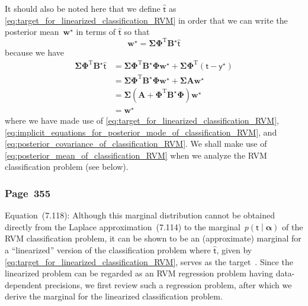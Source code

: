 \documentclass[12pt,a4paper]{article}
\newcommand{\erratum}[1]{%
\subsubsection*{#1}
\addcontentsline{toc}{subsection}{#1}}
\begin{document}
It should also be noted here that we define $\widehat{\bm{\mathsf{t}}}$ as
\eqref{eq:target_for_linearized_classification_RVM}
in order that we can write
the posterior mean~$\mathbf{w}^{\star}$ in terms of $\widehat{\bm{\mathsf{t}}}$ so that
\begin{equation}
\mathbf{w}^{\star}
= \bm{\Sigma} \bm{\Phi}^{\operatorname{T}} \mathbf{B}^{\star} \widehat{\bm{\mathsf{t}}}
\label{eq:posterior_mean_of_classification_RVM}
\end{equation}
because we have
\begin{align}
\bm{\Sigma} \bm{\Phi}^{\operatorname{T}} \mathbf{B}^{\star} \widehat{\bm{\mathsf{t}}}
&= \bm{\Sigma} \bm{\Phi}^{\operatorname{T}} \mathbf{B}^{\star} \bm{\Phi} \mathbf{w}^{\star}
+ \bm{\Sigma} \bm{\Phi}^{\operatorname{T}} \left(\bm{\mathsf{t}} - \bm{\mathsf{y}}^{\star}\right)
\\
&= \bm{\Sigma} \bm{\Phi}^{\operatorname{T}} \mathbf{B}^{\star} \bm{\Phi} \mathbf{w}^{\star}
+ \bm{\Sigma} \mathbf{A} \mathbf{w}^{\star}
\\
&= \bm{\Sigma}
\left( \mathbf{A} + \bm{\Phi}^{\operatorname{T}} \mathbf{B}^{\star} \bm{\Phi} \right)
\mathbf{w}^{\star}
\\
&= \mathbf{w}^{\star}
\end{align}
where we have made use of
\eqref{eq:target_for_linearized_classification_RVM},
\eqref{eq:implicit_equations_for_posterior_mode_of_classification_RVM}, and
\eqref{eq:posterior_covariance_of_classification_RVM}.
We shall make use of \eqref{eq:posterior_mean_of_classification_RVM}
when we analyze the RVM classification problem (see below).

\erratum{Page~355}
Equation~(7.118):
Although this marginal distribution cannot be obtained directly from
the Laplace approximation~(7.114) to
the marginal~$p\left(\bm{\mathsf{t}}\middle|\bm{\alpha}\right)$ of the RVM classification problem,
it can be shown to be an (approximate) marginal for
a ``linearized'' version of the classification problem
where $\widehat{\bm{\mathsf{t}}}$, given by \eqref{eq:target_for_linearized_classification_RVM},
serves as the target~\citep{Tipping:fast}.
Since the linearized problem can be regarded as
an RVM regression problem having data-dependent precisions,
we first review such a regression problem,
after which we derive the marginal for the linearized classification problem.
\end{document}
